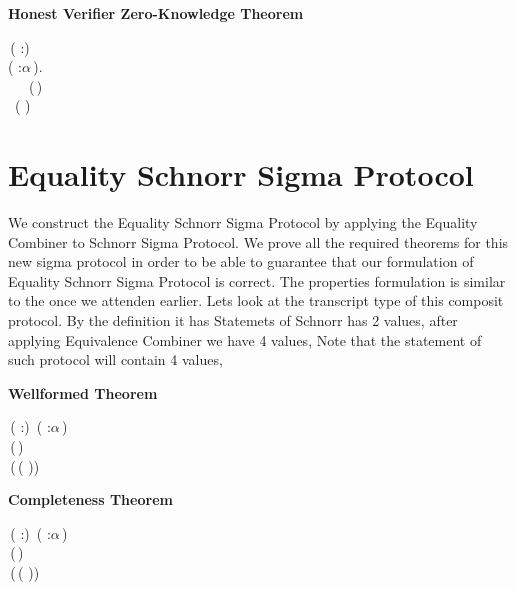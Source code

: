 \textbf{Honest Verifier Zero-Knowledge Theorem}
\begin{holmath}
    \,( :)\,\HOLSymConst{\HOLTokenImp{}}\\
\HOLSymConst{\HOLTokenForall{}}( :\ensuremath{\alpha}\,).\\
\,\,\,\,\HOLSymConst{\HOLTokenConj{}}\,\,\,\HOLSymConst{\HOLTokenConj{}}\,\,(\,)\,\HOLSymConst{=}\,\,\HOLSymConst{\HOLTokenImp{}}\\
\,\,\,(\,\,)
\end{holmath}  

\newpage
\section{Equality Schnorr Sigma Protocol}

We construct the Equality Schnorr Sigma Protocol by applying the Equality Combiner to Schnorr Sigma Protocol. 
We prove all the required theorems for this new sigma protocol in order to be able to guarantee that our formulation of 
Equality Schnorr Sigma Protocol is correct. The properties formulation is similar to the once we attenden earlier.
Lets look at the transcript type of this composit protocol.
By the definition it has 
Statemets of Schnorr has 2 values, after applying Equivalence Combiner we have 4 values,
Note that the statement of such protocol will contain 4 values, 

\textbf{Wellformed Theorem}
\begin{holmath}
    \,( :)\,\HOLSymConst{\HOLTokenConj{}}\,\,( :\ensuremath{\alpha}\,)\,\HOLSymConst{\HOLTokenConj{}}\,\,\,\HOLSymConst{\HOLTokenConj{}}\\
\,(\,)\,\HOLSymConst{=}\,\,\HOLSymConst{\HOLTokenImp{}}\\
\,(\,(\,\,))
\end{holmath}  

\textbf{Completeness Theorem}
\begin{holmath}
    \,( :)\,\HOLSymConst{\HOLTokenConj{}}\,\,( :\ensuremath{\alpha}\,)\,\HOLSymConst{\HOLTokenConj{}}\,\,\,\HOLSymConst{\HOLTokenConj{}}\\
\,(\,)\,\HOLSymConst{=}\,\,\HOLSymConst{\HOLTokenImp{}}\\
\,(\,(\,\,))
\end{holmath}  

